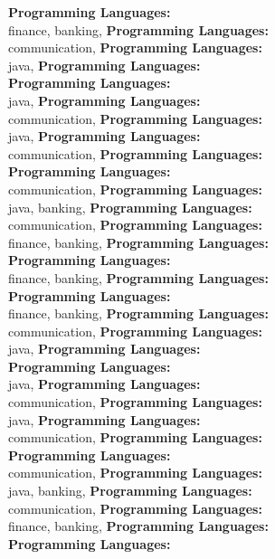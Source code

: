 \textbf{Programming Languages:} \\
finance, banking, \textbf{Programming Languages:} \\
communication, \textbf{Programming Languages:} \\
java, \textbf{Programming Languages:} \\
\textbf{Programming Languages:} \\
java, \textbf{Programming Languages:} \\
communication, \textbf{Programming Languages:} \\
java, \textbf{Programming Languages:} \\
communication, \textbf{Programming Languages:} \\
\textbf{Programming Languages:} \\
communication, \textbf{Programming Languages:} \\
java, banking, \textbf{Programming Languages:} \\
communication, \textbf{Programming Languages:} \\
finance, banking, \textbf{Programming Languages:} \\
\textbf{Programming Languages:} \\
finance, banking, \textbf{Programming Languages:} \\
\textbf{Programming Languages:} \\
finance, banking, \textbf{Programming Languages:} \\
communication, \textbf{Programming Languages:} \\
java, \textbf{Programming Languages:} \\
\textbf{Programming Languages:} \\
java, \textbf{Programming Languages:} \\
communication, \textbf{Programming Languages:} \\
java, \textbf{Programming Languages:} \\
communication, \textbf{Programming Languages:} \\
\textbf{Programming Languages:} \\
communication, \textbf{Programming Languages:} \\
java, banking, \textbf{Programming Languages:} \\
communication, \textbf{Programming Languages:} \\
finance, banking, \textbf{Programming Languages:} \\
\textbf{Programming Languages:} \\
